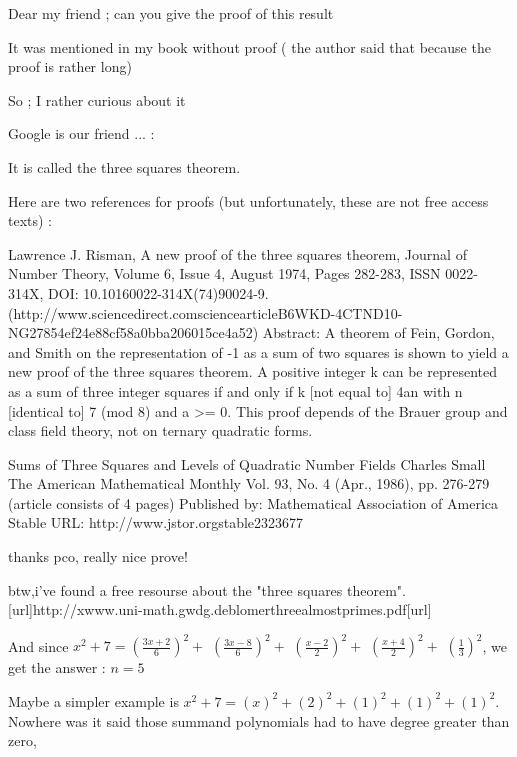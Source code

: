 \begin{solution}
	\begin{tcolorbox}   Dear my friend ; can you give the proof of this result 

    It was mentioned in my book without proof ( the author said that because the proof is rather long)

  So ; I rather curious about it\end{tcolorbox}
Google is our friend ... :

It is called the three squares theorem.

Here are two references for proofs (but unfortunately, these are not free access texts) :

Lawrence J. Risman, A new proof of the three squares theorem, Journal of Number Theory, Volume 6, Issue 4, August 1974, Pages 282-283, ISSN 0022-314X, DOI: 10.1016\/0022-314X(74)90024-9.
(http://www.sciencedirect.com\/science\/article\/B6WKD-4CTND10-NG\/2\/7854ef24e88cf58a0bba206015ce4a52)
Abstract: 
A theorem of Fein, Gordon, and Smith on the representation of -1 as a sum of two squares is shown to yield a new proof of the three squares theorem. A positive integer k can be represented as a sum of three integer squares if and only if k [not equal to] 4an with n [identical to] 7 (mod 8) and a >= 0. This proof depends of the Brauer group and class field theory, not on ternary quadratic forms.

Sums of Three Squares and Levels of Quadratic Number Fields 
Charles Small 
The American Mathematical Monthly
Vol. 93, No. 4 (Apr., 1986), pp. 276-279 
(article consists of 4 pages) 
Published by: Mathematical Association of America 
Stable URL: http://www.jstor.org\/stable\/2323677
\end{solution}



\begin{solution}
	thanks pco, really nice prove!  

btw,i've found a free resourse about the "three squares theorem".
[url]http://xwww.uni-math.gwdg.de\/blomer\/threealmostprimes.pdf[\/url]
\end{solution}



\begin{solution}
	\begin{tcolorbox}
And since $x^2+7=\left(\frac{3x+2}6\right)^2+$ $\left(\frac{3x-8}6\right)^2+$ $\left(\frac{x-2}2\right)^2+$ $\left(\frac{x+4}2\right)^2+$ $\left(\frac 13\right)^2$, we get the answer : $\boxed{n=5}$\end{tcolorbox}
Maybe a simpler example is $x^2 + 7 = (x)^2 + (2)^2 + (1)^2 + (1)^2 + (1)^2$. Nowhere was it said those summand polynomials had to have degree greater than zero,
\end{solution}



